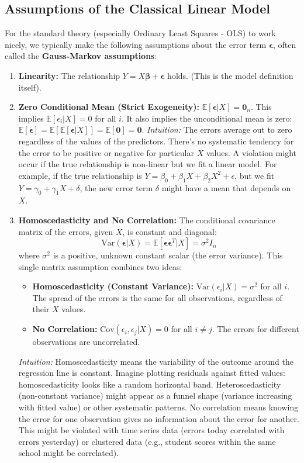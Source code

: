 \documentclass[11pt]{article}
\theoremstyle{definition}
\newcommand{\E}{\mathbb{E}} %
\newcommand{\Var}{\mathrm{Var}} %
\newcommand{\Cov}{\mathrm{Cov}} %
\newcommand{\T}{^T} %
\newcommand{\bbeta}{\bm{\beta}} %
\newcommand{\bepsilon}{\bm{\epsilon}} %
\newcommand{\bZero}{\mathbf{0}} %
\begin{document}
\subsection{Assumptions of the Classical Linear Model}
\label{subsec:lm_assumptions}

For the standard theory (especially Ordinary Least Squares - OLS) to work nicely, we typically make the following assumptions about the error term $\bepsilon$, often called the \textbf{Gauss-Markov assumptions}:

\begin{enumerate}
    \item \textbf{Linearity:} The relationship $Y = X\bbeta + \bepsilon$ holds. (This is the model definition itself).
    \item \textbf{Zero Conditional Mean (Strict Exogeneity):} $\E[\bepsilon | X] = \bZero_n$.
       This implies $\E[\epsilon_i | X] = 0$ for all $i$. It also implies the unconditional mean is zero: $\E[\bepsilon] = \E[\E[\bepsilon|X]] = \E[\bZero] = \bZero$.
       \textit{Intuition:} The errors average out to zero regardless of the values of the predictors. There's no systematic tendency for the error to be positive or negative for particular $X$ values. A violation might occur if the true relationship is non-linear but we fit a linear model. For example, if the true relationship is $Y = \beta_0 + \beta_1 X + \beta_2 X^2 + \epsilon$, but we fit $Y = \gamma_0 + \gamma_1 X + \delta$, the new error term $\delta$ might have a mean that depends on $X$.

    \item \textbf{Homoscedasticity and No Correlation:} The conditional covariance matrix of the errors, given $X$, is constant and diagonal:
       \[ \Var(\bepsilon | X) = \E[\bepsilon \bepsilon\T | X] = \sigma^2 I_n \]
       where $\sigma^2$ is a positive, unknown constant scalar (the error variance).
       This single matrix assumption combines two ideas:
       \begin{itemize}
           \item \textbf{Homoscedasticity (Constant Variance):} $\Var(\epsilon_i | X) = \sigma^2$ for all $i$. The spread of the errors is the same for all observations, regardless of their $X$ values.
           \item \textbf{No Correlation:} $\Cov(\epsilon_i, \epsilon_j | X) = 0$ for all $i \neq j$. The errors for different observations are uncorrelated.
       \end{itemize}
       \textit{Intuition:} Homoscedasticity means the variability of the outcome around the regression line is constant. Imagine plotting residuals against fitted values: homoscedasticity looks like a random horizontal band. Heteroscedasticity (non-constant variance) might appear as a funnel shape (variance increasing with fitted value) or other systematic patterns. No correlation means knowing the error for one observation gives no information about the error for another. This might be violated with time series data (errors today correlated with errors yesterday) or clustered data (e.g., student scores within the same school might be correlated).


\end{enumerate}
\end{document}

